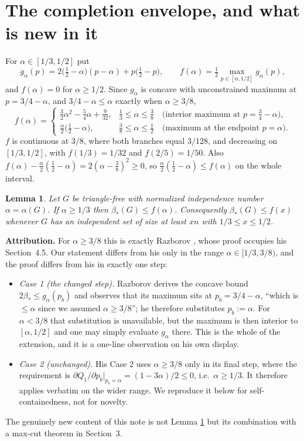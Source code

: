 \documentclass[11pt]{article}
\newtheorem{lemma}[theorem]{Lemma}
\theoremstyle{remark}
\newcommand{\bh}{\beta_*}
\begin{document}
\section{The completion envelope, and what is new in it}
For $\alpha\in[1/3,1/2]$ put
\[
 g_\alpha(p)=2\big(\tfrac12-\alpha\big)(p-\alpha)+p\big(\tfrac12-p\big),
 \qquad
 f(\alpha)=\tfrac12\max_{p\in[\alpha,1/2]}g_\alpha(p),
\]
and $f(\alpha)=0$ for $\alpha\ge1/2$. Since $g_\alpha$ is concave with
unconstrained maximum at $p=3/4-\alpha$, and $3/4-\alpha\le\alpha$ exactly when
$\alpha\ge3/8$,
\begin{equation}\label{fdef}
 f(\alpha)=\begin{cases}
  \frac32\alpha^2-\frac54\alpha+\frac9{32}, & \tfrac13\le\alpha\le\tfrac38
    \quad\text{(interior maximum at }p=\tfrac34-\alpha),\\[2pt]
  \frac{\alpha}{2}\big(\frac12-\alpha\big), & \tfrac38\le\alpha\le\tfrac12
    \quad\text{(maximum at the endpoint }p=\alpha).
 \end{cases}
\end{equation}
$f$ is continuous at $3/8$, where both branches equal $3/128$, and decreasing
on $[1/3,1/2]$, with $f(1/3)=1/32$ and $f(2/5)=1/50$. Also
$f(\alpha)-\frac{\alpha}{2}(\frac12-\alpha)=2(\alpha-\frac38)^2\ge0$, so
$\frac{\alpha}{2}(\frac12-\alpha)\le f(\alpha)$ on the whole interval.

\begin{lemma}\label{ind}
Let $G$ be triangle-free with normalized independence number
$\alpha=\alpha(G)$. If $\alpha\ge1/3$ then $\bh(G)\le f(\alpha)$. Consequently
$\bh(G)\le f(x)$ whenever $G$ has an independent set of size at least $xn$
with $1/3\le x\le1/2$.
\end{lemma}

\noindent\textbf{Attribution.} For $\alpha\ge3/8$ this is exactly Razborov
\cite[Theorem~3.6]{raz}, whose proof occupies his Section~4.5. Our statement
differs from his only in the range $\alpha\in[1/3,3/8)$, and the proof differs
from his in exactly one step:
\begin{itemize}
\item \emph{Case 1 (the changed step).} Razborov derives the concave bound
$2\bh\le g_\alpha(p_b)$ and observes that its maximum sits at
$p_b=3/4-\alpha$, ``which is $\le\alpha$ since we assumed $\alpha\ge3/8$'';
he therefore substitutes $p_b:=\alpha$. For $\alpha<3/8$ that substitution is
unavailable, but the maximum is then interior to $[\alpha,1/2]$ and one may
simply evaluate $g_\alpha$ there. This is the whole of the extension, and it
is a one-line observation on his own display.
\item \emph{Case 2 (unchanged).} His Case 2 uses $\alpha\ge3/8$ only in its
final step, where the requirement is
$\partial Q_1/\partial p_b|_{p_b=\alpha}=(1-3\alpha)/2\le0$, i.e.\
$\alpha\ge1/3$. It therefore applies verbatim on the wider range. We reproduce
it below for self-containedness, not for novelty.
\end{itemize}
The genuinely new content of this note is not Lemma \ref{ind} but its
combination with a max-cut theorem in Section~3.
\end{document}
